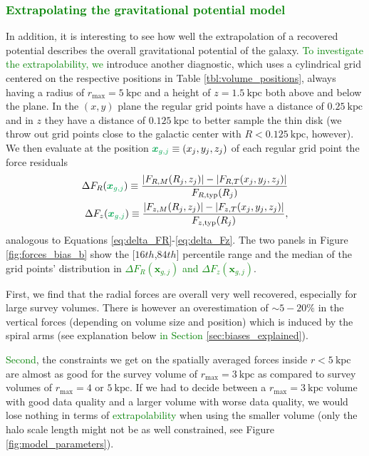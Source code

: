 \documentclass[iop,revtex4,numberedappendix,appendixfloats]{emulateapj}
\newcommand{\vect}[1]{\boldsymbol{#1}}
\newcommand{\NEW}[1]{\textcolor{Green}{#1}}
\newcommand{\OLD}[1]{}
\begin{document}
\subsubsection{\NEW{Extrapolating the gravitational potential model}}

In addition, it is interesting to see how well the extrapolation of a recovered potential describes the overall gravitational potential of the galaxy\OLD{, i.e., its predictive power}. \NEW{To investigate the extrapolability, we}\OLD{We} introduce\OLD{d} another diagnostic, which uses a cylindrical grid centered on the respective positions in Table \ref{tbl:volume_positions}, always having a radius of $r_\text{max}=5~\text{kpc}$ and a height of $z=1.5~\text{kpc}$ both above and below the plane.  In the $(x,y)$ plane the regular grid points have a distance of $0.25~\text{kpc}$ and in $z$ they have a distance of  $0.125~\text{kpc}$ to better sample the thin disk (we throw out grid points close to the galactic center with $R<0.125~\text{kpc}$, however). We then evaluate at the position $\OLD{g_j}\NEW{\vect{x}_{g,j}} \equiv (x_j,y_j,z_j)$ of each regular grid point the force residuals
\begin{eqnarray}
\Delta F_R(\OLD{g_j}\NEW{\vect{x}_{g,j}}) \equiv \frac{|F_{R,M}(R_j,z_j)| - |F_{R,T}(x_j,y_j,z_j)|}{F_{R,\text{typ}}(R_j)} \label{eq:delta_FR_grid}\\
\Delta F_z(\OLD{g_j}\NEW{\vect{x}_{g,j}}) \equiv \frac{|F_{z,M}(R_j,z_j)| - |F_{z,T}(x_j,y_j,z_j)|}{F_{z,\text{typ}}(R_j)},\label{eq:delta_Fz_grid}
\end{eqnarray}
analogous to Equations \eqref{eq:delta_FR}-\eqref{eq:delta_Fz}. The two panels in Figure \ref{fig:forces_bias_b} show the [$16th$,$84th$] percentile range and the median of the grid points' distribution in \OLD{$\Delta F_R(g_j)$ and $\Delta F_z(g_j)$}\NEW{$\Delta F_R(\vect{x}_{g,j})$ and $\Delta F_z(\vect{x}_{g,j})$}.

\OLD{Second, if we consider not the stars inside the survey volume, but the spatial average of the forces in the fixed cylindrical volume ($r_\text{max}=5~\text{kpc}$, as described above; Figure \ref{fig:forces_bias_b}),} First, we find that the radial forces are overall very well recovered, especially for large survey volumes. There is however an overestimation of $\sim5-20\%$ in the vertical forces (depending on volume size and position) which is induced by the spiral arms (see explanation below \NEW{in Section \ref{sec:biases_explained}}).

\OLD{Third}\NEW{Second}, the constraints we get on the spatially averaged forces inside $r<5~\text{kpc}$ are almost as good for the survey volume of $r_\text{max}=3~\text{kpc}$ as compared to survey volumes of $r_\text{max}=4$ or $5~\text{kpc}$. If we had to decide between a $r_\text{max}=3~\text{kpc}$ volume with good data quality and a larger volume with worse data quality, we would lose nothing in terms of \OLD{predictive power}\NEW{extrapolability} when using the smaller volume (only the halo scale length might not be as well constrained, see Figure \ref{fig:model_parameters}).
\end{document}
